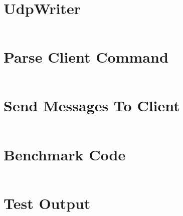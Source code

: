 \chapter{UdpWriter}
\label{appendix:udpWriter}

\inputminted[breaklines=true, breakanywhere]{go}{code/gamq/udp/udpwriter.go}

\chapter{Parse Client Command}
\label{appendix:parseClientCommand}

\inputminted[breaklines=true, breakanywhere, firstline=226, lastline=260]{go}{code/gamq/connectionmanager.go}

\chapter{Send Messages To Client}
\label{appendix:sendMessagesToClient}

\inputminted[breaklines=true, breakanywhere, firstline=35, lastline=67]{go}{code/gamq/messageshipper.go}

\chapter{Benchmark Code}
\label{chap:benchmarkCode}

\inputminted[breaklines]{python}{code/gamq/tools/benchmark/benchmark.py}

\chapter{Test Output}
\label{chap:testOutput}

\inputminted[breaklines]{bash}{code/goTestOutput}
